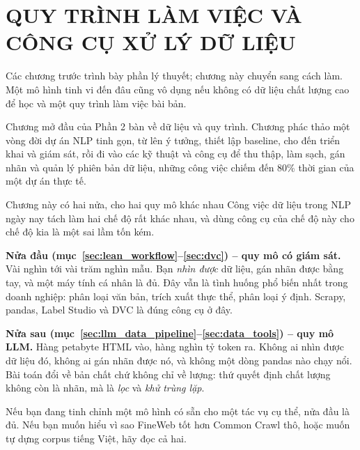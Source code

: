 \chapter{QUY TRÌNH LÀM VIỆC VÀ CÔNG CỤ XỬ LÝ DỮ LIỆU}
\label{chap:workflow_data}

Các chương trước trình bày phần lý thuyết; chương này chuyển sang cách làm. Một mô hình tinh vi đến đâu cũng vô dụng nếu không có dữ liệu chất lượng cao để học và một quy trình làm việc bài bản.

Chương mở đầu của Phần 2 bàn về dữ liệu và quy trình. Chương phác thảo một vòng đời dự án NLP tinh gọn, từ lên ý tưởng, thiết lập baseline, cho đến triển khai và giám sát, rồi đi vào các kỹ thuật và công cụ để thu thập, làm sạch, gán nhãn và quản lý phiên bản dữ liệu, những công việc chiếm đến 80\% thời gian của một dự án thực tế.


\begin{deepdive}{Chương này có hai nửa, cho hai quy mô khác nhau}
Công việc dữ liệu trong NLP ngày nay tách làm hai chế độ rất khác nhau, và dùng công cụ của chế độ này cho chế độ kia là một sai lầm tốn kém.

\textbf{Nửa đầu (mục~\ref{sec:lean_workflow}--\ref{sec:dvc}) -- quy mô có giám sát.} Vài nghìn tới vài trăm nghìn mẫu. Bạn \emph{nhìn được} dữ liệu, gán nhãn được bằng tay, và một máy tính cá nhân là đủ. Đây vẫn là tình huống phổ biến nhất trong doanh nghiệp: phân loại văn bản, trích xuất thực thể, phân loại ý định. Scrapy, pandas, Label Studio và DVC là đúng công cụ ở đây.

\textbf{Nửa sau (mục~\ref{sec:llm_data_pipeline}--\ref{sec:data_tools}) -- quy mô LLM.} Hàng petabyte HTML vào, hàng nghìn tỷ token ra. Không ai nhìn được dữ liệu đó, không ai gán nhãn được nó, và không một dòng pandas nào chạy nổi. Bài toán đổi về bản chất chứ không chỉ về lượng: thứ quyết định chất lượng không còn là nhãn, mà là \emph{lọc} và \emph{khử trùng lặp}.

Nếu bạn đang tinh chỉnh một mô hình có sẵn cho một tác vụ cụ thể, nửa đầu là đủ. Nếu bạn muốn hiểu vì sao FineWeb tốt hơn Common Crawl thô, hoặc muốn tự dựng corpus tiếng Việt, hãy đọc cả hai.
\end{deepdive}
